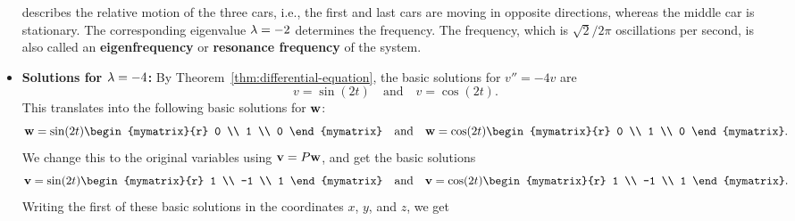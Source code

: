 \begin{solution}
\begin{itemize}
\begin{equation*}
    \end{equation*}
    describes the relative motion of the three cars, i.e., the first
    and last cars are moving in opposite directions, whereas the
    middle car is stationary. The corresponding eigenvalue
    $\lambda=-2$ determines the frequency. The frequency, which is
    $\sqrt{2}/2\pi$ oscillations per second, is also called an
    \textbf{eigenfrequency}%
     or \textbf{resonance
      frequency}%
     of the system.
  \item \textbf{Solutions for $\lambda=-4$:}
    By Theorem~\ref{thm:differential-equation}, the basic solutions
    for $v'' = -4v$ are
    \begin{equation*}
      v=\sin(2t)
      \quad\mbox{and}\quad
      v=\cos(2t).
    \end{equation*}
    This translates into the following basic solutions for $\vect{w}$:
    \begin{equation*}
      \vect{w}
      = \sin(2t)\begin{mymatrix}{r} 0 \\ 1 \\ 0 \end{mymatrix}
      \quad\mbox{and}\quad
      \vect{w}
      = \cos(2t)\begin{mymatrix}{r} 0 \\ 1 \\ 0 \end{mymatrix}.
    \end{equation*}
    We change this to the original variables using $\vect{v} =
    P\vect{w}$, and get the basic solutions
    \begin{equation*}
      \vect{v}
      = \sin(2t)\begin{mymatrix}{r} 1 \\ -1 \\ 1 \end{mymatrix}
      \quad\mbox{and}\quad
      \vect{v}
      = \cos(2t)\begin{mymatrix}{r} 1 \\ -1 \\ 1 \end{mymatrix}.
    \end{equation*}
    Writing the first of these basic solutions in the coordinates $x$,
    $y$, and $z$, we get
    \begin{equation*}

\end{equation*}
\end{itemize}
\end{solution}
